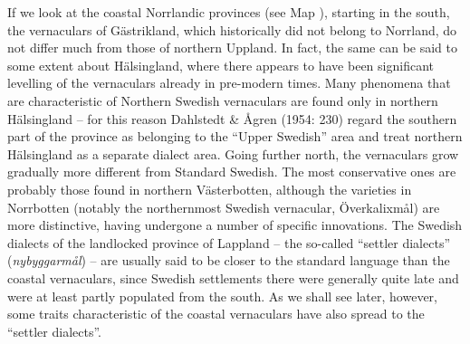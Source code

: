 \begin{styleBodytextC}
If we look at the coastal Norrlandic provinces (see Map ), starting in the south, the vernaculars of Gästrikland, which historically did not belong to Norrland, do not differ much from those of northern Uppland. In fact, the same can be said to some extent about Hälsingland, where there appears to have been significant levelling of the vernaculars already in pre-modern times. Many phenomena that are characteristic of Northern Swedish vernaculars are found only in northern Hälsingland – for this reason Dahlstedt \& Ågren (1954: 230) regard the southern part of the province as belonging to the “Upper Swedish” area and treat northern Hälsingland as a separate dialect area. Going further north, the vernaculars grow gradually more different from Standard Swedish. The most conservative ones are probably those found in northern Västerbotten, although the varieties in Norrbotten (notably the northernmost Swedish vernacular, Överkalixmål) are more distinctive, having undergone a number of specific innovations. The Swedish dialects of the landlocked province of Lappland – the so-called “settler dialects” (\textit{nybyggarmål}) – are usually said to be closer to the standard language than the coastal vernaculars, since Swedish settlements there were generally quite late and were at least partly populated from the south. As we shall see later, however, some traits characteristic of the coastal vernaculars have also spread to the “settler dialects”. 

\end{styleBodytextC}

